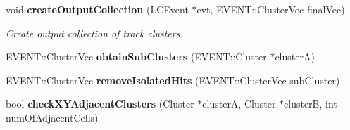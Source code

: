 \begin{DoxyCompactItemize}
\item 
void {\bf createOutputCollection} (LCEvent $\ast$evt, EVENT::ClusterVec finalVec)
\begin{DoxyCompactList}\small\item\em Create output collection of track clusters. \item\end{DoxyCompactList}\item 
EVENT::ClusterVec {\bfseries obtainSubClusters} (EVENT::Cluster $\ast$clusterA)\label{classCALICE_1_1AngleTrackFinder_add0057082ccc0bcea73c30d9926fe317}

\item 
EVENT::ClusterVec {\bfseries removeIsolatedHits} (EVENT::ClusterVec subCluster)\label{classCALICE_1_1AngleTrackFinder_a1af99dd0d0e7dc58b6a1348a5d3729fd}

\item 
bool {\bfseries checkXYAdjacentClusters} (Cluster $\ast$clusterA, Cluster $\ast$clusterB, int numOfAdjacentCells)\label{classCALICE_1_1AngleTrackFinder_a1786792116034051608781193e344134}

\end{DoxyCompactItemize}
